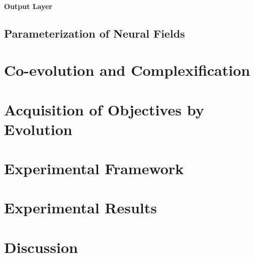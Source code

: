 \paragraph{Output Layer}



\subsection{Parameterization of Neural Fields}


\section{Co-evolution and Complexification}
\label{sec:chp3-coevolution}

\section{Acquisition of Objectives by Evolution}
\label{sec:chp3-acquisition}

\section{Experimental Framework}
\label{sec:chp3-experimental}

\section{Experimental Results}
\label{sec:chp3-results}

\section{Discussion}
\label{sec:chp3-discussion}

